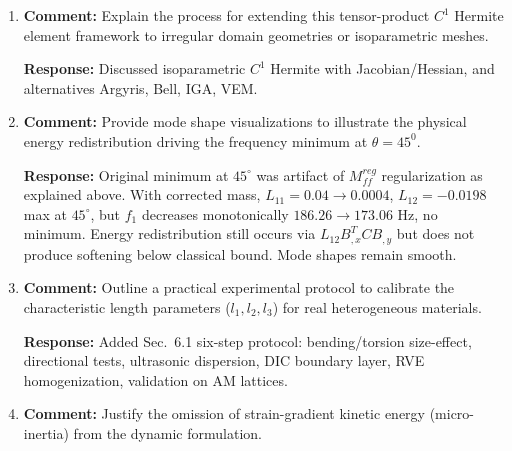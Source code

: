 \documentclass[12pt,a4paper]{article}
\begin{document}
\begin{enumerate}[leftmargin=14pt, itemsep=10pt]
\textbf{Response:} For $4\times2\times2$ mesh at $l/L_x=0.05$, $u_{avg}=4.7876$ $\mu$m, reaction error $1.06\times10^{-12}\%$, $\kappa=3.27\times10^5$. Tricubic Hermite carries derivative DOFs, clamped-gradient enforced essentially, $3\times3\times3$ Gauss exact, diagonal scaling keeps $\kappa<10^6$. Full mesh sensitivity completed in Appendix Table~\ref{tab:mesh_3D} via \texttt{mesh\_sensitivity\_3D.m}: $2\times1\times1$ gives $u=4.5665$ $\mu$m, $f_1=193.00$ Hz; $4\times2\times2$ gives $u=4.7876$ $\mu$m, $f_1=178.72$ Hz; $6\times3\times3$ gives $u=4.8371$ $\mu$m, $f_1=174.96$ Hz. Coarse $2\times1\times1$ under-resolves boundary layer $a=\sqrt{l^2/10}=0.0158$ m ($h_x=0.5$ m $\gg a$), causing $5.9\%$ displacement and $9.3\%$ frequency variation vs finest. Convergence monotonic from below for displacement and above for frequency.

\item \textbf{Comment:} Explain the process for extending this tensor-product $C^1$ Hermite element framework to irregular domain geometries or isoparametric meshes.

\textbf{Response:} Discussed isoparametric $C^1$ Hermite with Jacobian/Hessian, and alternatives Argyris, Bell, IGA, VEM.

\item \textbf{Comment:} Provide mode shape visualizations to illustrate the physical energy redistribution driving the frequency minimum at $\theta = 45^0$.

\textbf{Response:} Original minimum at $45^\circ$ was artifact of $M_{ff}^{reg}$ regularization as explained above. With corrected mass, $L_{11}=0.04\to0.0004$, $L_{12}=-0.0198$ max at $45^\circ$, but $f_1$ decreases monotonically $186.26\to173.06$ Hz, no minimum. Energy redistribution still occurs via $L_{12}B_{,x}^TCB_{,y}$ but does not produce softening below classical bound. Mode shapes remain smooth.

\item \textbf{Comment:} Outline a practical experimental protocol to calibrate the characteristic length parameters ($l_1, l_2, l_3$) for real heterogeneous materials.

\textbf{Response:} Added Sec.~6.1 six-step protocol: bending/torsion size-effect, directional tests, ultrasonic dispersion, DIC boundary layer, RVE homogenization, validation on AM lattices.

\item \textbf{Comment:} Justify the omission of strain-gradient kinetic energy (micro-inertia) from the dynamic formulation.


\end{enumerate}
\end{document}
